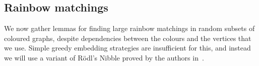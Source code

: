 











\subsection{Rainbow matchings}\label{Section_matchings}
We now gather lemmas for finding large rainbow matchings in random subsets of coloured graphs, despite dependencies between the colours and the vertices that we use. Simple greedy embedding strategies are insufficient for this, and instead we will use a variant of R\"odl's Nibble proved by the authors in~\cite{montgomery2018decompositions}.

